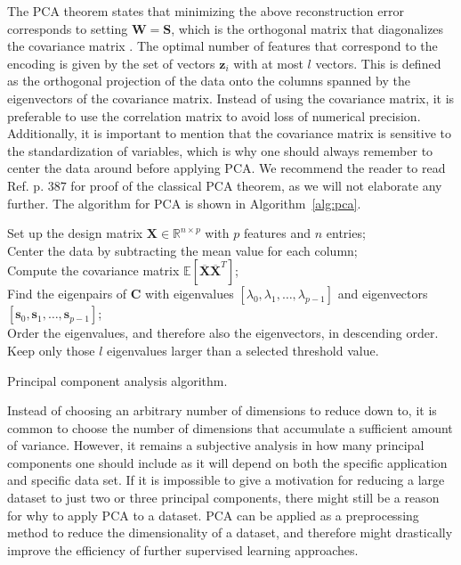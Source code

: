 The PCA theorem states that minimizing the above reconstruction error corresponds to setting $\boldsymbol{W}=\boldsymbol{S}$, which is the orthogonal matrix that diagonalizes the covariance matrix \cite{Murphy2012}. The optimal number of features that correspond to the encoding is given by the set of vectors $\boldsymbol{z}_i$ with at most $l$ vectors. This is defined as the orthogonal projection of the data onto the columns spanned by the eigenvectors of the covariance matrix. Instead of using the covariance matrix, it is preferable to use the correlation matrix to avoid loss of numerical precision. Additionally, it is important to mention that the covariance matrix is sensitive to the standardization of variables, which is why one should always remember to center the data around before applying PCA.  We recommend the reader to read Ref. \cite{Murphy2012} p. $387$ for proof of the classical PCA theorem, as we will not elaborate any further. The algorithm for PCA is shown in Algorithm~\ref{alg:pca}.

\begin{algorithm}[H]
\SetAlgoLined
 Set up the design matrix $\boldsymbol{X}\in {\mathbb{R}}^{n\times p}$ with $p$ features and $n$ entries;\\
 Center the data by subtracting the mean value for each column;\\
 Compute the covariance matrix $\mathbb{E}[\overline{\boldsymbol{X}}\overline{\boldsymbol{X}}^T]$; \\
 Find the eigenpairs of $\boldsymbol{C}$ with eigenvalues $[\lambda_0,\lambda_1,\dots,\lambda_{p-1}]$ and eigenvectors $[\boldsymbol{s}_0,\boldsymbol{s}_1,\dots,\boldsymbol{s}_{p-1}]$;\\
 Order the eigenvalues, and therefore also the eigenvectors, in descending order.
 Keep only those $l$ eigenvalues larger than a selected threshold value.
 \caption{Principal component analysis algorithm.}
 \label{alg:pca}
\end{algorithm}

\noindent Instead of choosing an arbitrary number of dimensions to reduce down to, it is common to choose the number of dimensions that accumulate a sufficient amount of variance. However, it remains a subjective analysis in how many principal components one should include as it will depend on both the specific application and specific data set. If it is impossible to give a motivation for reducing a large dataset to just two or three principal components, there might still be a reason for why to apply PCA to a dataset. PCA can be applied as a preprocessing method to reduce the dimensionality of a dataset, and therefore might drastically improve the efficiency of further supervised learning approaches.


